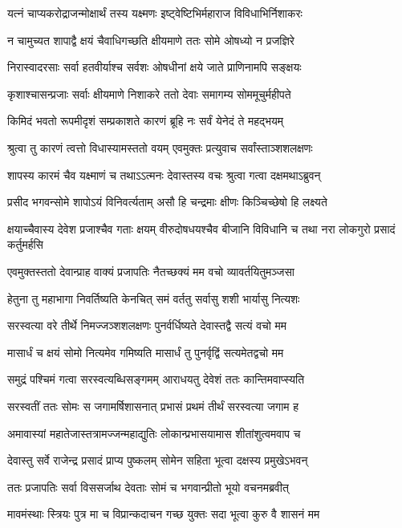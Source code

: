 \twolineshloka
{यत्नं चाप्यकरोद्राजन्मोक्षार्थं तस्य यक्ष्मणः}
{इष्ट्वेष्टिभिर्महाराज विविधाभिर्निशाकरः}


\twolineshloka
{न चामुच्यत शापाद्वै क्षयं चैवाधिगच्छति}
{क्षीयमाणे ततः सोमे ओषध्यो न प्रजज्ञिरे}


\twolineshloka
{निरास्वादरसाः सर्वा हतवीर्याश्च सर्वशः}
{ओषधीनां क्षये जाते प्राणिनामपि सङ्क्षयः}


\twolineshloka
{कृशाश्चासन्प्रजाः सर्वाः क्षीयमाणे निशाकरे}
{ततो देवाः समागम्य सोममूचुर्महीपते}


\twolineshloka
{किमिदं भवतो रूपमीदृशं सम्प्रकाशते}
{कारणं ब्रूहि नः सर्वं येनेदं ते महद्भयम्}


\twolineshloka
{श्रुत्वा तु कारणं त्वत्तो विधास्यामस्ततो वयम्}
{एवमुक्तः प्रत्युवाच सर्वांस्ताञ्शशलक्षणः}


\twolineshloka
{शापस्य कारमं चैव यक्ष्माणं च तथाऽऽत्मनः}
{देवास्तस्य वचः श्रुत्वा गत्वा दक्षमथाऽब्रुवन्}


\twolineshloka
{प्रसीद भगवन्सोमे शापोऽयं विनिवर्त्यताम्}
{असौ हि चन्द्रमाः क्षीणः किञ्चिच्छेषो हि लक्ष्यते}


\threelineshloka
{क्षयाच्चैवास्य देवेश प्रजाश्चैव गताः क्षयम्}
{वीरुदोषधयश्चैव बीजानि विविधानि च}
{तथा नरा लोकगुरो प्रसादं कर्तुमर्हसि}


\twolineshloka
{एवमुक्तस्ततो देवान्प्राह वाक्यं प्रजापतिः}
{नैतच्छक्यं मम वचो व्यावर्तयितुमञ्जसा}


\twolineshloka
{हेतुना तु महाभागा निवर्तिष्यति केनचित्}
{समं वर्ततु सर्वासु शशी भार्यासु नित्यशः}


\twolineshloka
{सरस्वत्या वरे तीर्थे निमज्जञ्शशलक्षणः}
{पुनर्वर्धिष्यते देवास्तद्वै सत्यं वचो मम}


\twolineshloka
{मासार्धं च क्षयं सोमो नित्यमेव गमिष्यति}
{मासार्धं तु पुनर्वृद्विं सत्यमेतद्वचो मम}


\twolineshloka
{समुद्रं पश्चिमं गत्वा सरस्वत्यब्धिसङ्गमम्}
{आराधयतु देवेशं ततः कान्तिमवाप्स्यति}


\twolineshloka
{सरस्वतीं ततः सोमः स जगामर्षिशासनात्}
{प्रभासं प्रथमं तीर्थं सरस्वत्या जगाम ह}


\twolineshloka
{अमावास्यां महातेजास्तत्रामज्जन्महाद्युतिः}
{लोकान्प्रभासयामास शीतांशुत्वमवाप च}


\twolineshloka
{देवास्तु सर्वे राजेन्द्र प्रसादं प्राप्य पुष्कलम्}
{सोमेन सहिता भूत्वा दक्षस्य प्रमुखेऽभवन्}


\twolineshloka
{ततः प्रजापतिः सर्वा विससर्जाथ देवताः}
{सोमं च भगवान्प्रीतो भूयो वचनमब्रवीत्}


\twolineshloka
{मावमंस्थाः स्त्रियः पुत्र मा च विप्रान्कदाचन}
{गच्छ युक्तः सदा भूत्वा कुरु वै शासनं मम}


